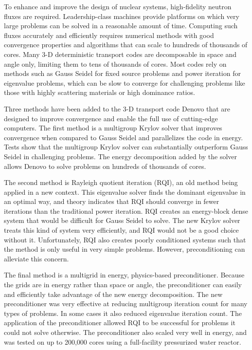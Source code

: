 
\noindent       %
To enhance and improve the design of nuclear systems, high-fidelity neutron fluxes are required. Leadership-class machines provide platforms on which very large problems can be solved in a reasonable amount of time. Computing such fluxes accurately and efficiently requires numerical methods with good convergence properties and algorithms that can scale to hundreds of thousands of cores. Many 3-D deterministic transport codes are decomposable in space and angle only, limiting them to tens of thousands of cores. Most codes rely on methods such as Gauss Seidel for fixed source problems and power iteration for eigenvalue problems, which can be slow to converge for challenging problems like those with highly scattering materials or high dominance ratios. 

\vspace*{0.5em}
\noindent       %
Three methods have been added to the 3-D \Sn transport code Denovo that are designed to improve convergence and enable the full use of cutting-edge computers. The first method is a multigroup Krylov solver that improves convergence when compared to Gauss Seidel and parallelizes the code in energy. Tests show that the multigroup Krylov solver can substantially outperform Gauss Seidel in challenging problems. The energy decomposition added by the solver allows Denovo to solve problems on hundreds of thousands of cores. 

\vspace*{0.5em}
\noindent       %
The second method is Rayleigh quotient iteration (RQI), an old method being applied in a new context. This eigenvalue solver finds the dominant eigenvalue in an optimal way, and theory indicates that RQI should converge in fewer iterations than the traditional power iteration. RQI creates an energy-block dense system that would be difficult for Gauss Seidel to solve. The new Krylov solver treats this kind of system very efficiently, and RQI would not be a good choice without it. Unfortunately, RQI also creates poorly conditioned systems such that the method is only useful in very simple problems. However, preconditioning can alleviate this concern. 

\vspace*{0.5em}
\noindent       %
The final method is a multigrid in energy, physics-based preconditioner. Because the grids are in energy rather than space or angle, the preconditioner can easily and efficiently take advantage of the new energy decomposition. The new preconditioner was very effective at reducing multigroup iteration count for many types of problems. In some cases it also reduced eigenvalue iteration count. The application of the preconditioner allowed RQI to be successful for problems it could not solve otherwise. The preconditioner also scaled very well in energy, and was tested on up to 200,000 cores using a full-facility pressurized water reactor.

